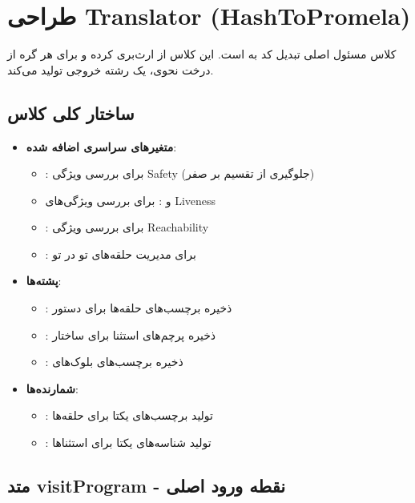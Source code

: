 \documentclass[12pt]{report}
\begin{document}
	\chapter{طراحی Translator (HashToPromela)}
	
	کلاس  مسئول اصلی تبدیل کد  به  است. \newline این کلاس از  ارث‌بری کرده و برای هر گره از درخت نحوی، یک رشته خروجی تولید می‌کند.
	
	\section{ساختار کلی کلاس}
	
	\begin{itemize}
		\item \textbf{متغیرهای سراسری اضافه شده}: 
		\begin{itemize}
			\item {}: برای بررسی ویژگی Safety (جلوگیری از تقسیم بر صفر)
			\item {} و : برای بررسی ویژگی‌های Liveness
			\item {}: برای بررسی ویژگی Reachability
			\item {}: برای مدیریت حلقه‌های تو در تو
		\end{itemize}
		
		\item \textbf{پشته‌ها}:
		\begin{itemize}
			\item {}: ذخیره برچسب‌های حلقه‌ها برای دستور 
			\item {}: ذخیره پرچم‌های استثنا برای ساختار 
			\item {}: ذخیره برچسب‌های بلوک‌های 
		\end{itemize}
		
		\item \textbf{شمارنده‌ها}:
		\begin{itemize}
			\item {}: تولید برچسب‌های یکتا برای حلقه‌ها
			\item {}: تولید شناسه‌های یکتا برای استثناها
		\end{itemize}
	\end{itemize}
	
	\section{متد visitProgram - نقطه ورود اصلی}
	
\end{document}
